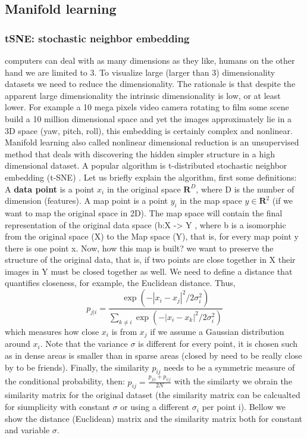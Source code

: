 \documentclass[11pt]{article}
\begin{document}
\subsection{Manifold learning}

\subsubsection{tSNE: stochastic neighbor embedding}
computers can deal with as many dimensions as they like, humans on the other hand we are limited to 3. To visualize large (larger than 3) dimensionality datasets we need to reduce the dimensionality. The rationale is that despite the apparent large dimensionality the intrinsic dimensionality is low, or at least lower. For example a 10 mega pixels video camera rotating to film some scene build a 10 million dimensional space and yet the images approximately lie in a 3D space (yaw, pitch, roll), this embedding is certainly complex and nonlinear.
Manifold learning also called nonlinear dimensional reduction is an unsupervised method that deals with discovering the hidden simpler structure in a high dimensional dataset.
A popular algorithm is t-distributed stochastic neighbor embedding (t-SNE) \cite{maaten2008visualizing}.
Let us briefly explain the algorithm, first some definitions:
A \textbf{data point} is a point $x_i$ in the original space $\mathbf{R}^D$, where D is the number of dimension (features). A map point is a point $y_i$ in the map space $y \in \mathbf{R}^2$ (if we want to map the original space in 2D). The map space will contain the final representation of the original data space (b:X -> Y , where b is a isomorphic from the original space (X) to the Map space (Y), that is, for every map point y there is one point x. 
Now, how this map is built? we want to preserve the structure of the original data, that is, if two points are close together in X their images in Y must be closed together as well. We need to define a distance that quantifies closeness, for example, the Euclidean distance. Thus, 
\begin{equation}
p_{j|i} = \frac{\exp\left(-\left| x_i - x_j\right|^2 \big/ 2\sigma_i^2\right)}{\displaystyle\sum_{k \neq i} \exp\left(-\left| x_i - x_k\right|^2 \big/ 2\sigma_i^2\right)}
\end{equation}
which measures how close $x_i$ is from $x_j$ if we assume a Gaussian distribution around $x_i$. Note that the variance $\sigma$ is different for every point, it is chosen such as in dense areas is smaller than in sparse areas (closed by need to be really close by to be friends). 
Finally, the similarity $p_{ij}$ needs to be a symmetric measure of the conditional probability, then:
\(p_{ij} = \frac{p_{j|i} + p_{i|j}}{2N}\)
with the similarty we obrain the similarity matrix for the original dataset (the similarity matrix can be calcualted for siumplicity with constant $\sigma$ or using a different $\sigma_i$ per point i).
Bellow we show the distance (Euclidean) matrix and the similarity matrix both for constant and variable $\sigma$.
\end{document}
